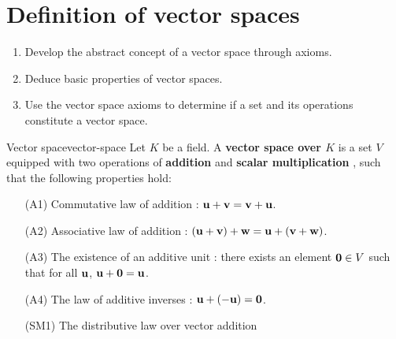 \section{Definition of vector spaces}

\begin{outcome}
  \begin{enumerate}
  \item Develop the abstract concept of a vector space through axioms.
  \item Deduce basic properties of vector spaces.
  \item Use the vector space axioms to determine if a set and its
    operations constitute a vector space.
  \end{enumerate}
\end{outcome}

\begin{definition}{Vector space}{vector-space}
  Let $K$ be a field. A \textbf{vector space over $K$} is a set $V$ equipped with two operations of
  \textbf{addition}%
    and
  \textbf{scalar multiplication}%
  ,
  such that the following properties hold:
  \begin{itemize}\setlength\itemsep{0em}
  \item[(A1)] Commutative law of addition%
    :
    $\mbox{\bf u} + \mbox{\bf v}=\mbox{\bf v} + \mbox{\bf u}$.
  \item[(A2)] Associative law of addition%
    :
    $(\mbox{\bf u} + \mbox{\bf v}) + \mbox{\bf w}=\mbox{\bf u} + (\mbox{\bf v} + \mbox{\bf w})$.
  \item[(A3)] The existence of an additive unit%
    : there exists an element $\mbox{\bf 0}\in
    V$ such that for all $\mbox{\bf u}$,
    $\mbox{\bf u} + \mbox{\bf 0}=\mbox{\bf u}$.
  \item[(A4)] The law of additive inverses%
    :
    $\mbox{\bf u} + (-\mbox{\bf u}) =\mbox{\bf 0}$.
  \item[(SM1)] The distributive law over vector addition%

\end{itemize}
\end{definition}
